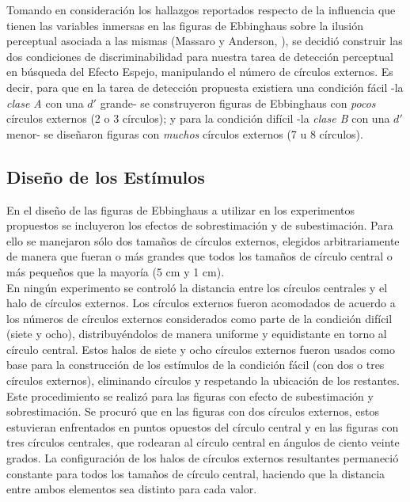 Tomando en consideración los hallazgos reportados respecto de la influencia que tienen las variables inmersas en las figuras de Ebbinghaus sobre la ilusión perceptual asociada a las mismas (Massaro y Anderson, \citeyear{Massaro1971}), se decidió construir las dos condiciones de discriminabilidad para nuestra tarea de detección perceptual en búsqueda del Efecto Espejo, manipulando el número de círculos externos. Es decir, para que en la tarea de detección propuesta existiera una condición fácil -la \textit{clase A} con una $d'$ grande- se construyeron figuras de Ebbinghaus con \textit{pocos} círculos externos (2 o 3 círculos); y para la condición difícil -la \textit{clase B} con una $d'$ menor- se diseñaron figuras con \textit{muchos} círculos externos (7 u 8 círculos).\\ 

\subsection{Diseño de los Estímulos}

En el diseño de las figuras de Ebbinghaus a utilizar en los experimentos propuestos se incluyeron los efectos de sobrestimación y de subestimación. Para ello se manejaron sólo dos tamaños de círculos externos, elegidos arbitrariamente de manera que fueran o más grandes que todos los tamaños de círculo central o más pequeños que la mayoría (5 cm y 1 cm).\\

En ningún experimento se controló la distancia entre los círculos centrales y el halo de círculos externos. Los círculos externos fueron acomodados de acuerdo a los números de círculos externos considerados como parte de la condición difícil (siete y ocho), distribuyéndolos de manera uniforme y equidistante en torno al círculo central. Estos halos de siete y ocho círculos externos fueron usados como base para la construcción de los estímulos de la condición fácil (con dos o tres círculos externos), eliminando círculos y respetando la ubicación de los restantes. Este procedimiento se realizó para las figuras con efecto de subestimación y sobrestimación. Se procuró que en las figuras con dos círculos externos, estos estuvieran enfrentados en puntos opuestos del círculo central y en las figuras con tres círculos centrales, que rodearan al círculo central en ángulos de ciento veinte grados. La configuración de los halos de círculos externos resultantes permaneció constante para todos los tamaños de círculo central, haciendo que la distancia entre ambos elementos sea distinto para cada valor.\\

